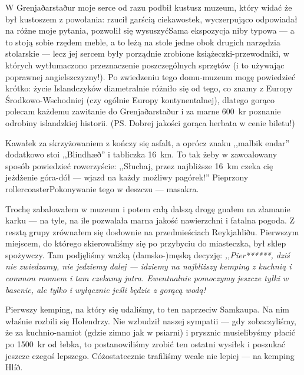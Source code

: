 W Grenjaðarstaður moje serce od razu podbił kustusz muzeum, który widać że był kustoszem z powołania: rzucił garścią ciekawostek, wyczerpująco odpowiadał na różne moje pytania, pozwolił się wysuszyć\textellipsis Sama ekspozycja niby typowa --- a to stoją sobie rzędem meble, a to leżą na stole jedne obok drugich narzędzia stolarskie --- lecz jej sercem były porządnie zrobione książeczki-przewodniki, w których wytłumaczono przeznaczenie poszczególnych sprzętów (i to używając poprawnej angielszczyzny!). Po zwiedzeniu tego domu-muzeum mogę powiedzieć krótko: życie Islandczyków diametralnie różniło się od tego, co znamy z Europy Środkowo-Wschodniej (czy ogólnie Europy kontynentalnej), dlatego gorąco polecam każdemu zawitanie do Grenjaðarstaður i za marne 600~kr poznanie odrobiny islandzkiej historii. (PS. Dobrej jakości gorąca herbata w cenie biletu!)

Kawałek za skrzyżowaniem  z  kończy się asfalt, a oprócz znaku ,,malbik endar'' dodatkowo stoi ,,Blindhæð'' i tabliczka 16~km. To tak żeby w zawoalowany sposób powiedzieć rowerzyście: ,,Słuchaj, przez najbliższe 16~km czeka cię jeżdżenie góra-dół --- wjazd na każdy możliwy pagórek!'' Pieprzony rollercoaster\textellipsis Pokonywanie tego w deszczu --- masakra.


Trochę zabalowałem w muzeum i potem całą dalszą drogę gnałem na złamanie karku --- na tyle, na ile pozwalała marna jakość nawierzchni i fatalna pogoda. Z resztą grupy zrównałem się dosłownie na przedmieściach Reykjahliðu. Pierwszym miejscem, do którego skierowaliśmy się po przybyciu do miasteczka, był sklep spożywczy. Tam podjęliśmy ważką \mbox{(damsko-)}męską decyzję: \emph{,,Pier******, dziś nie zwiedzamy, nie jedziemy dalej --- idziemy na najbliższy kemping z kuchnią i common roomem i tam czekamy jutra. Ewentualnie pomoczymy jeszcze tyłki w basenie, ale tylko i wyłącznie jeśli będzie z gorącą wodą!}

Pierwszy kemping, na który się udaliśmy, to ten naprzeciw Samkaupa. Na nim właśnie rozbili się Holendrzy. Nie wzbudził naszej sympatii --- gdy zobaczyliśmy, że za kuchnio-namiot (gdzie zimno jak w psiarni) \linebreak i prysznic musielibyśmy płacić po 1500~kr od łebka, to postanowiliśmy zrobić ten ostatni wysiłek i poszukać jeszcze czegoś lepszego. Cóż\textellipsis osta\-tecznie trafiliśmy wcale nie lepiej --- na kemping Hlíð.

